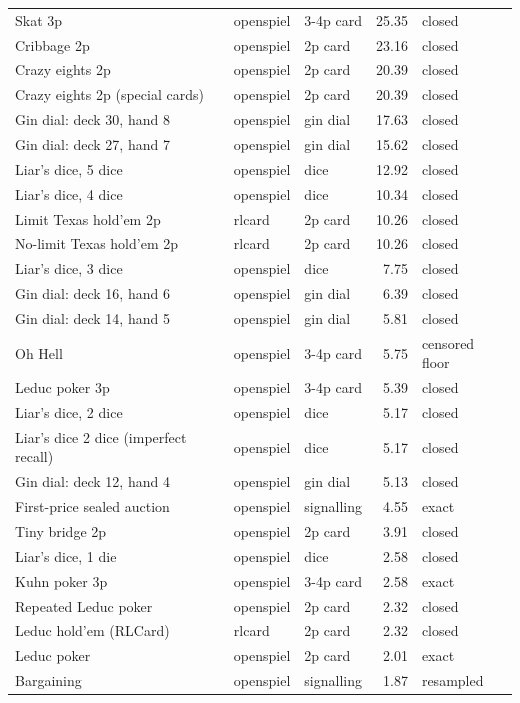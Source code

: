 \begin{longtable}{l l l r l}
Skat 3p & openspiel & 3-4p card & 25.35 & closed \\
Cribbage 2p & openspiel & 2p card & 23.16 & closed \\
Crazy eights 2p & openspiel & 2p card & 20.39 & closed \\
Crazy eights 2p (special cards) & openspiel & 2p card & 20.39 & closed \\
Gin dial: deck 30, hand 8 & openspiel & gin dial & 17.63 & closed \\
Gin dial: deck 27, hand 7 & openspiel & gin dial & 15.62 & closed \\
Liar's dice, 5 dice & openspiel & dice & 12.92 & closed \\
Liar's dice, 4 dice & openspiel & dice & 10.34 & closed \\
Limit Texas hold'em 2p & rlcard & 2p card & 10.26 & closed \\
No-limit Texas hold'em 2p & rlcard & 2p card & 10.26 & closed \\
Liar's dice, 3 dice & openspiel & dice & 7.75 & closed \\
Gin dial: deck 16, hand 6 & openspiel & gin dial & 6.39 & closed \\
Gin dial: deck 14, hand 5 & openspiel & gin dial & 5.81 & closed \\
Oh Hell & openspiel & 3-4p card & 5.75 & censored floor \\
Leduc poker 3p & openspiel & 3-4p card & 5.39 & closed \\
Liar's dice, 2 dice & openspiel & dice & 5.17 & closed \\
Liar's dice 2 dice (imperfect recall) & openspiel & dice & 5.17 & closed \\
Gin dial: deck 12, hand 4 & openspiel & gin dial & 5.13 & closed \\
First-price sealed auction & openspiel & signalling & 4.55 & exact \\
Tiny bridge 2p & openspiel & 2p card & 3.91 & closed \\
Liar's dice, 1 die & openspiel & dice & 2.58 & closed \\
Kuhn poker 3p & openspiel & 3-4p card & 2.58 & exact \\
Repeated Leduc poker & openspiel & 2p card & 2.32 & closed \\
Leduc hold'em (RLCard) & rlcard & 2p card & 2.32 & closed \\
Leduc poker & openspiel & 2p card & 2.01 & exact \\
Bargaining & openspiel & signalling & 1.87 & resampled \\

\end{longtable}
